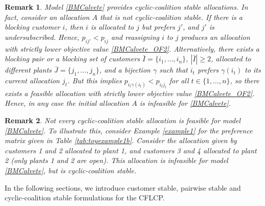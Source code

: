 \documentclass[preprint,11pt,authoryear]{elsarticle}
\newcommand\cd[1]{{\color{violet}#1}}
\newtheorem{remark}{Remark}
\begin{document}
\begin{remark}
    Model \eqref{BMCalvete} provides cyclic-coalition stable allocations. In fact, consider an allocation $A$ that is not cyclic-coalition stable. If there is a blocking customer $i$, then $i$ is allocated to $j$ but prefers $j'$, and $j'$ is undersubscribed. Hence, $p_{ij'}<p_{ij}$ and reassigning $i$ to $j$ produces an allocation with strictly lower objective value \eqref{BMCalvete_OF2}. Alternatively, there exists a blocking pair or a blocking set of customers $\bar{I}=\{i_1, \dots, i_n\}$, $|\bar{I}| \ge 2$, allocated to different plants $\bar{J}=\{j_1, \dots, j_n\}$, and a bijection $\gamma$ such that $i_t$ prefers $\gamma(i_t)$ to its current allocation $j_t$. But this implies $p_{i_t\gamma(i_t)} < p_{i_tj_t}$ for all $t\in \{1,\dots,n\}$, so there exists a feasible allocation with strictly lower objective value \eqref{BMCalvete_OF2}. Hence, in any case the initial allocation $A$ is infeasible for \eqref{BMCalvete}.
\end{remark}
 \begin{remark}
    Not every cyclic-coalition stable allocation is feasible for model \eqref{BMCalvete}. To illustrate this, consider Example \ref{example1} for the preference matrix given in Table \ref{tab:toyexample1b}. Consider the allocation given by customers 1 and 2 allocated to plant 1, and customers 3 and 4 allocated to plant 2 (only plants 1 and 2 are open). This allocation is infeasible for model \eqref{BMCalvete}, but is cyclic-coalition stable.
\end{remark}
In the following sections, we introduce customer stable, pairwise stable and cyclic-coalition stable formulations for the CFLCP. 
\end{document}
